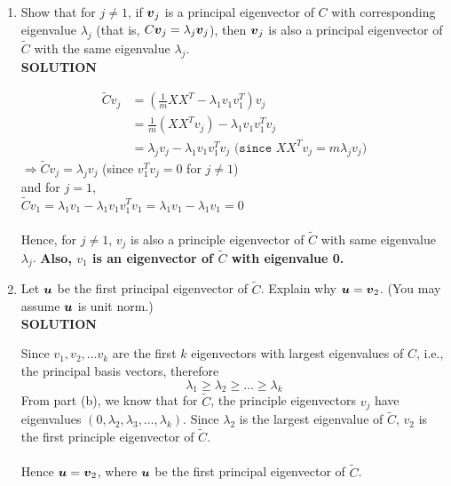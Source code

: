 \documentclass{article}
\begin{document}
\begin{enumerate}[label=(\alph*)]
\item Show that for $j \neq 1$, if $\boldsymbol{v}_j$ is a principal eigenvector of $C$ with corresponding eigenvalue $\lambda_j$ (that is, $C \boldsymbol{v}_j = \lambda_j \boldsymbol{v}_j$), then $\boldsymbol{v}_j$ is also a principal eigenvector of $\tilde C$ with the same eigenvalue $\lambda_j$.\\
\textbf{SOLUTION}
\begin{mdframed}[backgroundcolor=lightgray]
\begin{align*}
    \tilde C v_j &= (\frac{1}{m}XX^T - \lambda_1v_1v_1^T)v_j\\
    &= \frac{1}{m}(XX^Tv_j) - \lambda_1v_1v_1^Tv_j\\
    &= \lambda_jv_j - \lambda_1v_1v_1^Tv_j   \texttt{        (since $XX^Tv_j = m\lambda_jv_j$)}
\end{align*}
$\Rightarrow \tilde C v_j = \lambda_jv_j$ (since $v_1^Tv_j = 0$ for $j \neq 1$) \\ and for $j=1$,\\ 
$ \tilde C v_1 = \lambda_1v_1 - \lambda_1v_1v_1^Tv_1 = \lambda_1 v_1 - \lambda_1 v_1 = 0$ \\\\
Hence, for $j \neq 1$, $v_j$ is also a principle eigenvector of $\tilde C$ with same eigenvalue $\lambda_j$. \textbf{Also, $v_1$ is an eigenvector of $\tilde C$ with eigenvalue 0.}
\end{mdframed}

\item Let $\boldsymbol{u}$ be the first principal eigenvector of $\tilde C$. Explain why $\boldsymbol{u} = \boldsymbol{v}_2$. (You may assume $\boldsymbol{u}$ is unit norm.)\\
\textbf{SOLUTION}
\begin{mdframed}[backgroundcolor=lightgray]
Since $v_1, v_2, \ldots v_k$ are the first $k$ eigenvectors with largest eigenvalues of $C$, i.e., the principal basis vectors, therefore
\begin{equation*}
\lambda_1 \ge \lambda_2 \ge \ldots \ge \lambda_k
\end{equation*}
From part (b), we know that for $\tilde C$, the principle eigenvectors $v_j$ have eigenvalues $(0,\lambda_2,\lambda_3, \ldots, \lambda_k)$. Since $\lambda_2$ is the largest eigenvalue of $\tilde C$, $v_2$ is the first principle eigenvector of $\tilde C$.\\\\
Hence $\boldsymbol{u} = \boldsymbol{v}_2$, where $\boldsymbol{u}$ be the first principal eigenvector of $\tilde C$.
\end{mdframed}


\end{enumerate}
\end{document}
